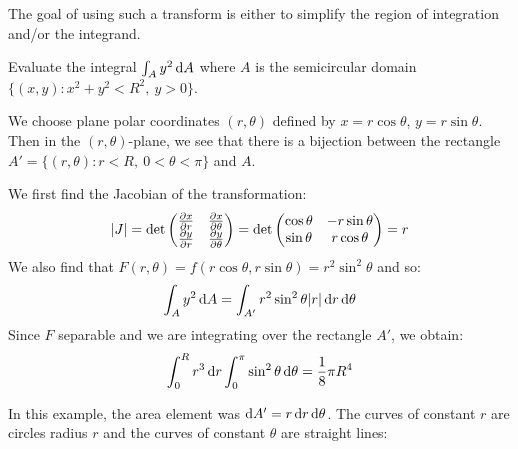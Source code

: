 \documentclass[../main.tex]{subfiles}
\begin{document}
\begin{remark}
  The goal of using such a transform is either to simplify the region of integration and/or the integrand.
\end{remark}
\begin{example}
  Evaluate the integral $\int_A y^2 \d{A}$ where $A$ is the semicircular domain $\{(x, y): x^2 + y^2 < R^2,\ y > 0\}$.

  We choose plane polar coordinates $(r, \theta)$ defined by $x = r\cos \theta$, $y = r\sin\theta$.
  Then in the $(r, \theta)$-plane, we see that there is a bijection between the rectangle $A' = \{(r, \theta): r < R,\ 0 < \theta < \pi\}$ and $A$.

  We first find the Jacobian of the transformation:
  \[
    |J| = \det \begin{pmatrix}
    \pderiv{x}{r} & \pderiv{x}{\theta} \\
    \pderiv{y}{r} & \pderiv{y}{\theta} \\
    \end{pmatrix} = \det \begin{pmatrix}
    \cos \theta & -r\sin \theta \\
    \sin \theta & r\cos \theta \\
    \end{pmatrix} = r
  \]
  We also find that $F(r, \theta) = f(r \cos \theta, r \sin \theta) = r^2 \sin^2 \theta$ and so:
  \[
    \int_A y^2 \d{A} = \int_{A'} r^2 \sin^2 \theta |r| \d{r} \d{\theta}
  \]
  Since $F$ separable and we are integrating over the rectangle $A'$, we obtain:
  \[
    \int_{0}^{R} r^3 \d{r} \int_{0}^{\pi} \sin^2\theta \d{\theta} = \frac{1}{8}\pi R^4
  \]

  In this example, the area element was $\d{A'} = r \d{r} \d{\theta}$.
  The curves of constant $r$ are circles radius $r$ and the curves of constant $\theta$ are straight lines:
  \begin{center}
\end{center}
\end{example}
\end{document}
